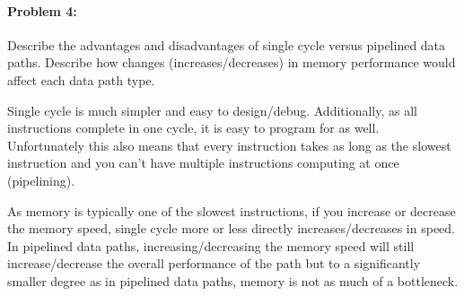 \documentclass[12pt,letterpaper,titlepage]{article}
\begin{document}
\begin{raggedright}
\begin{enumerate}
\end{enumerate}

\paragraph{Problem 4: }
Describe the advantages and disadvantages of single cycle versus pipelined data paths. Describe how changes (increases/decreases) in memory performance would affect each data path type.

Single cycle is much simpler and easy to design/debug. Additionally, as all instructions complete in one cycle, it is easy to program for as well. Unfortunately this also means that every instruction takes as long as the slowest instruction and you can't have multiple instructions computing at once (pipelining).

As memory is typically one of the slowest instructions, if you increase or decrease the memory speed, single cycle more or less directly increases/decreases in speed. In pipelined data paths, increasing/decreasing the memory speed will still increase/decrease the overall performance of the path but to a significantly smaller degree as in pipelined data paths, memory is not as much of a bottleneck.


\end{raggedright}
\end{document}
